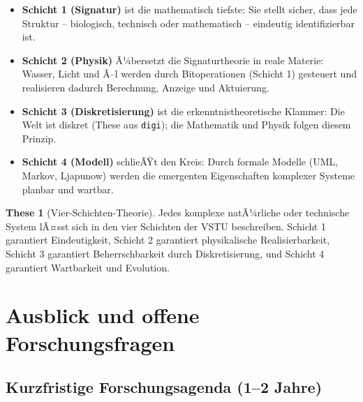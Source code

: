 ﻿\documentclass[a4paper,12pt]{scrreprt}
\theoremstyle{definition}
\newtheorem{these}{These}[section]
\begin{document}
\begin{itemize}
  \item \textbf{Schicht 1 (Signatur)} ist die mathematisch tiefste:
    Sie stellt sicher, dass jede Struktur -- biologisch, technisch oder
    mathematisch -- eindeutig identifizierbar ist.
  \item \textbf{Schicht 2 (Physik)} Ã¼bersetzt die Signaturtheorie in
    reale Materie: Wasser, Licht und Ã–l werden durch Bitoperationen
    (Schicht 1) gesteuert und realisieren dadurch Berechnung, Anzeige
    und Aktuierung.
  \item \textbf{Schicht 3 (Diskretisierung)} ist die erkenntnistheoretische
    Klammer: Die Welt ist diskret (These aus \texttt{digi}); die Mathematik
    und Physik folgen diesem Prinzip.
  \item \textbf{Schicht 4 (Modell)} schlieÃŸt den Kreis: Durch formale
    Modelle (UML, Markov, Ljapunow) werden die emergenten Eigenschaften
    komplexer Systeme planbar und wartbar.
\end{itemize}

\begin{these}[Vier-Schichten-Theorie]
  Jedes komplexe natÃ¼rliche oder technische System lÃ¤sst sich in den
  vier Schichten der VSTU beschreiben. Schicht 1 garantiert Eindeutigkeit,
  Schicht 2 garantiert physikalische Realisierbarkeit, Schicht 3 garantiert
  Beherrschbarkeit durch Diskretisierung, und Schicht 4 garantiert
  Wartbarkeit und Evolution.
\end{these}

\section{Ausblick und offene Forschungsfragen}
\label{sec:ausblick}

\subsection{Kurzfristige Forschungsagenda (1--2 Jahre)}
\end{document}
